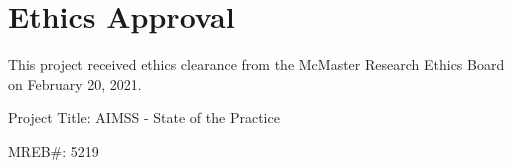 \chapter{Ethics Approval}
\label{ap_ethics}
This project received ethics clearance from the McMaster Research Ethics Board on February 20, 2021. \newline

\noindent Project Title: AIMSS - State of the Practice \newline

\noindent MREB\#: 5219